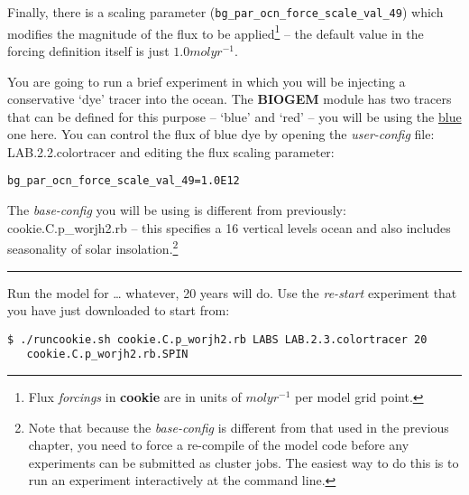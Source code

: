 Finally, there is a scaling parameter (\texttt{bg\_par\_ocn\_force\_scale\_val\_49}) which modifies the magnitude of the flux to be applied\footnote{Flux \textit{forcings} in \textbf{cookie} are in units of \(mol yr^{-1}\) per model grid point.} -- the default value in the forcing definition itself is just \(1.0 mol yr^{-1}\).

\newpage 

\noindent You are going to run a brief experiment in which you will be injecting a conservative ‘dye’ tracer into the ocean. The \textbf{BIOGEM} module has two tracers that can be defined for this purpose – ‘blue’ and ‘red’ -- you will be using the \uline{blue} one here. You can control the flux of blue dye by opening the \textit{user-config} file: \textsf{\footnotesize LAB.2.2.colortracer} and editing the flux scaling parameter:

\vspace{-2mm}\small\begin{verbatim}
bg_par_ocn_force_scale_val_49=1.0E12
\end{verbatim}\normalsize\vspace{-2mm}

\vspace{1mm}
The \textit{base-config} you will be using is different from previously: \textsf{\footnotesize cookie.C.p\_worjh2.rb} – this specifies a 16 vertical levels ocean and also includes seasonality of solar insolation.\footnote{Note that because the \textit{base-config} is different from that used in the previous chapter, you need to force a re-compile of the model code before any experiments can be submitted as cluster jobs. The easiest way to do this is to run an experiment interactively at the command line.}

\vspace{1mm}\noindent\rule{4cm}{0.5pt}\vspace{2mm}

\noindent Run the model for … whatever, 20 years will do. Use the \textit{re-start} experiment that you have just downloaded to start from:

\vspace{-2mm}\small\begin{verbatim}
$ ./runcookie.sh cookie.C.p_worjh2.rb LABS LAB.2.3.colortracer 20 
   cookie.C.p_worjh2.rb.SPIN
\end{verbatim}\normalsize\vspace{-2mm}

